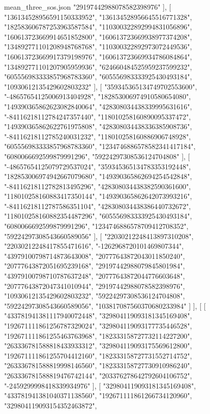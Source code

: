 \begin{filecontents*}[overwrite]{mean_three_sos.json}
    "29197442988078582398976"
   ],
   [
    "136134528956591150333952",
    "136134528956645516771328",
    "182583606787253963587584",
    "110300322892994831056896",
    "160613723669914651852800",
    "160613723669938977374208",
    "134892771101208948768768",
    "110300322892973072449536",
    "160613723669917379198976",
    "160613723669934786084864",
    "134892771101207905959936",
    "624660484525959237599232",
    "605556983333857968783360",
    "605556983333925430493184",
    "10930612135429602803232"
   ],
   [
    "359345365134749702553600",
    "-48657654125006913404928",
    "182853006974910580654080",
    "149390365862623082840064",
    "428308034438339995631616",
    "-84116218112784247357440",
    "118010258160890095337472",
    "149390365862622761975808",
    "428308034438336385908736",
    "-84116218112785240031232",
    "118010258160886906748928",
    "605556983333857968783360",
    "1234746886578582341417184",
    "6080066692599879991296",
    "59224297308536124704808"
   ],
   [
    "-48657654125079729537024",
    "359345365134783353192448",
    "182853006974942667079680",
    "149390365862694254542848",
    "-84116218112782813495296",
    "428308034438382590361600",
    "118010258160883417350144",
    "149390365862642073993216",
    "-84116218112787586351104",
    "428308034438386440732672",
    "118010258160882354487296",
    "605556983333925430493184",
    "6080066692599879991296",
    "1234746886578709412708352",
    "59224297308543660589056"
   ],
   [
    "22030212248413897310208",
    "22030212248417855471616",
    "-1262968720101469807344",
    "43979100798714873643008",
    "20777643872043011850240",
    "20777643872051695239168",
    "29197442988079845801984",
    "43979100798710787637248",
    "20777643872044776603648",
    "20777643872047341010944",
    "29197442988078582398976",
    "10930612135429602803232",
    "59224297308536124704808",
    "59224297308543660589056",
    "103817087560370680233984"
   ]
  ],
  [
   [
    "433781941381117940072448",
    "329804119093181345169408",
    "192671111861256787329024",
    "329804119093177735446528",
    "192671111861255463763968",
    "182333158727732114227200",
    "263336781588818433933312",
    "329804119093175569612800",
    "192671111861255704412160",
    "182333158727731552714752",
    "263336781588819998146560",
    "182333158727730910986240",
    "263336781588819476742144",
    "203376278642792604106752",
    "-2459299998418339934976"
   ],
   [
    "329804119093181345169408",
    "433781941381040371138560",
    "192671111861266734120960",
    "329804119093154352463872",

\end{filecontents*}
